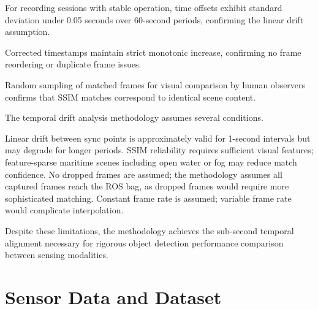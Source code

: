 \documentclass{erauthesis}
\begin{document}

For recording sessions with stable operation, time offsets exhibit standard deviation under 0.05 seconds over 60-second periods, confirming the linear drift assumption.


Corrected timestamps maintain strict monotonic increase, confirming no frame reordering or duplicate frame issues.


Random sampling of matched frames for visual comparison by human observers confirms that SSIM matches correspond to identical scene content.


The temporal drift analysis methodology assumes several conditions.

Linear drift between sync points is approximately valid for 1-second intervals but may degrade for longer periods.
SSIM reliability requires sufficient visual features; feature-sparse maritime scenes including open water or fog may reduce match confidence.
No dropped frames are assumed; the methodology assumes all captured frames reach the ROS bag, as dropped frames would require more sophisticated matching.
Constant frame rate is assumed; variable frame rate would complicate interpolation.

Despite these limitations, the methodology achieves the sub-second temporal alignment necessary for rigorous object detection performance comparison between sensing modalities.




\section{Sensor Data and Dataset}
\label{sec:sensor_data_dataset}

\end{document}
